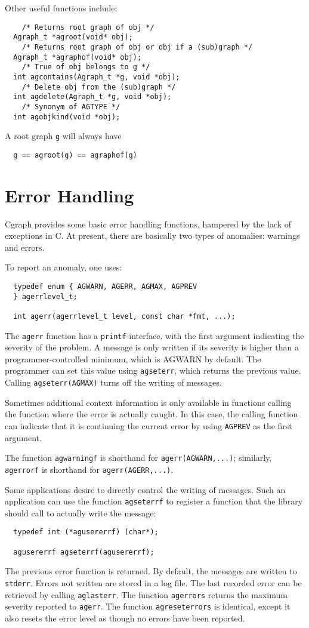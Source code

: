 \documentclass[11pt,letterpaper]{article}
\begin{document}
Other useful functions include:
\begin{verbatim}
    /* Returns root graph of obj */
  Agraph_t *agroot(void* obj);        
    /* Returns root graph of obj or obj if a (sub)graph */
  Agraph_t *agraphof(void* obj);      
    /* True of obj belongs to g */
  int agcontains(Agraph_t *g, void *obj);  
    /* Delete obj from the (sub)graph */
  int agdelete(Agraph_t *g, void *obj);    
    /* Synonym of AGTYPE */
  int agobjkind(void *obj);           
\end{verbatim}
A root graph \verb"g" will always have
\begin{verbatim}
  g == agroot(g) == agraphof(g)
\end{verbatim}

\section{Error Handling}
\label{sec:errorhandling}

Cgraph provides some basic error handling functions, hampered by the
lack of exceptions in C. At present, there are basically two types of anomalies: 
warnings and errors. 

To report an anomaly, one uses:
\begin{verbatim}
  typedef enum { AGWARN, AGERR, AGMAX, AGPREV 
  } agerrlevel_t;

  int agerr(agerrlevel_t level, const char *fmt, ...);
\end{verbatim}
The \verb"agerr" function has a \verb"printf"-interface, with the first argument
indicating the severity of the problem.
A message is only written if its severity is higher than a programmer-controlled minimum, 
which is AGWARN by default. The programmer can set this value using \verb"agseterr", 
which returns the previous value. Calling \verb"agseterr(AGMAX)" turns off the writing of messages.

Sometimes additional context information is only available in functions calling the function 
where the error is actually caught. In this case, the calling function can indicate that it 
is continuing the current error by using \verb"AGPREV" as the first argument.

The function \verb"agwarningf" is shorthand for \verb"agerr(AGWARN,...)"; similarly,
\verb"agerrorf" is shorthand for \verb"agerr(AGERR,...)".

Some applications desire to directly control the writing of messages. Such an application can 
use the function \verb"agseterrf" to register a function that the library should call to actually 
write the message:
\begin{verbatim}
  typedef int (*agusererrf) (char*);

  agusererrf agseterrf(agusererrf);
\end{verbatim}
The previous error function is returned. By default, the messages are written to \verb"stderr".
Errors not written are stored in a log file. The last recorded error can be retrieved by 
calling \verb"aglasterr".
The function \verb"agerrors" returns the maximum severity reported to \verb"agerr".
The function \verb"agreseterrors" is identical, except it also resets the error level
as though no errors have been reported.
\end{document}
